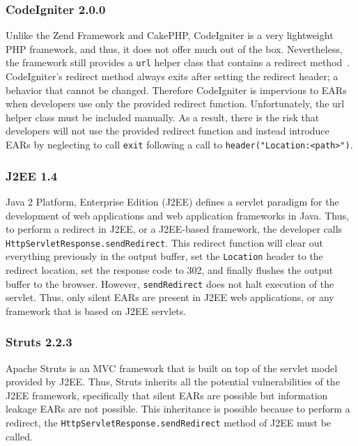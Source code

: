\subsubsection{CodeIgniter 2.0.0}
Unlike the Zend Framework and CakePHP, CodeIgniter is a very lightweight PHP
framework, and thus, it does not offer much out of the box. Nevertheless, the
framework still provides a \texttt{url} helper class that contains a redirect
method~\cite{codeigniter-url}. CodeIgniter's redirect method always exits after
setting the redirect header; a behavior that cannot be changed. Therefore
CodeIgniter is impervious to EARs when developers use only the provided
redirect function. Unfortunately, the url helper class must be included
manually. As a result, there is the risk that developers will not use the
provided redirect function and instead introduce EARs by neglecting to call
\texttt{exit} following a call to \texttt{header("Location:<path>")}.

\subsubsection{J2EE 1.4}
Java 2 Platform, Enterprise Edition (J2EE) defines a serv\-let paradigm for
the development of web applications and web application frameworks in Java.
Thus, to perform a redirect in J2EE, or a J2EE-based framework, the
developer calls \texttt{Http\-Servlet\-Response.sendRedirect}. This redirect
function will clear out everything previously in the output buffer, set the
\texttt{Location} header to the redirect location, set the response code to
302, and finally flushes the output buffer to the browser. However,
\texttt{sendRedirect} does not halt execution of the servlet. Thus, only
silent EARs are present in J2EE web applications, or any framework that is
based on J2EE servlets.

\subsubsection{Struts 2.2.3}
Apache Struts is an MVC framework that is built on top of the servlet model
provided by J2EE. Thus, Struts inherits all the potential vulnerabilities
of the J2EE framework, specifically that silent EARs are possible but
information leakage EARs are not possible. This inheritance is possible because to perform a
redirect, the \texttt{Http\-Servlet\-Response.send\-Redirect} method of J2EE must
be called.

